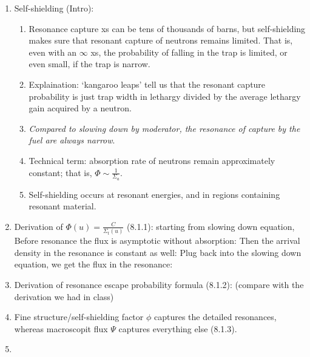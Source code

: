 \documentclass{school-22.211-notes}
\date{February 27, 2012}
\begin{document}
\maketitle

\begin{enumerate}
\item Self-shielding (Intro): 
  \begin{enumerate}
  \item Resonance capture xs can be tens of thousands of barns, but self-shielding makes sure that resonant capture of neutrons remains limited. That is, even with an $\infty$ xs, the probability of falling in the trap is limited, or even small, if the trap is narrow. 
  \item Explaination: `kangaroo leaps' tell us that the resonant capture probability is just trap width in lethargy divided by the average lethargy gain acquired by a neutron. 
  \item \textit{Compared to slowing down by moderator, the resonance of capture by the fuel are always narrow}.
  \item Technical term: absorption rate of neutrons remain approximately constant; that is, $\Phi \sim \frac{1}{\Sigma_a}$. 
  \item Self-shielding occurs at resonant energies, and in regions containing resonant material. 
  \end{enumerate}
\item Derivation of $\Phi(u)  = \frac{C}{\Sigma_t(u)}$ (8.1.1): starting from slowing down equation,
  Before resonance the flux is asymptotic without absorption:
  Then the arrival density in the resonance is constant as well:
  Plug back into the slowing down equation, we get the flux in the resonance:
\item Derivation of resonance escape probability formula (8.1.2): 
(compare with the derivation we had in class)
\item Fine structure/self-shielding factor $\phi$ captures the detailed resonances, whereas macroscopit flux $\Psi$ captures everything else (8.1.3).
\item 

\end{enumerate}
\end{document}
